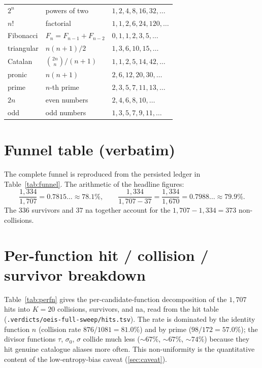\documentclass[11pt,a4paper]{article}
\newcommand{\sig}{\sigma}
\newcommand{\Ktwenty}{K\!=\!20}
\theoremstyle{definition}
\begin{document}
\begin{longtable}{@{}lll@{}}
$2^n$       & powers of two                             & $1,2,4,8,16,32,\dots$\\
$n!$        & factorial                                 & $1,1,2,6,24,120,\dots$\\
Fibonacci   & $F_n=F_{n-1}+F_{n-2}$                      & $0,1,1,2,3,5,\dots$\\
triangular  & $n(n{+}1)/2$                               & $1,3,6,10,15,\dots$\\
Catalan     & $\binom{2n}{n}/(n{+}1)$                    & $1,1,2,5,14,42,\dots$\\
pronic      & $n(n{+}1)$                                 & $2,6,12,20,30,\dots$\\
prime       & $n$-th prime                              & $2,3,5,7,11,13,\dots$\\
$2n$        & even numbers                              & $2,4,6,8,10,\dots$\\
odd         & odd numbers                               & $1,3,5,7,9,11,\dots$\\
\bottomrule
\end{longtable}

\section{Funnel table (verbatim)}
\label{app:funnel}

The complete funnel is reproduced from the persisted ledger in
Table~\ref{tab:funnel}. The arithmetic of the headline figures:
\[
  \frac{1{,}334}{1{,}707} = 0.7815\ldots \approx 78.1\%,
  \qquad
  \frac{1{,}334}{1{,}707 - 37} = \frac{1{,}334}{1{,}670} = 0.7988\ldots \approx 79.9\% .
\]
The $336$ survivors and $37$ na together account for the
$1{,}707 - 1{,}334 = 373$ non-collisions.

\section{Per-function hit / collision / survivor breakdown}
\label{app:perfn}

Table~\ref{tab:perfn} gives the per-candidate-function decomposition of the
$1{,}707$ hits into $\Ktwenty$ collisions, survivors, and na, read from the hit
table (\texttt{.verdicts/oeis-full-sweep/hits.tsv}). The rate is dominated by
the identity function $n$ (collision rate $876/1081 = 81.0\%$) and by prime
($98/172 = 57.0\%$); the divisor functions $\tau$, $\sig_0$, $\sig$ collide
much less ($\sim\!67\%$, $\sim\!67\%$, $\sim\!74\%$) because they hit
genuine catalogue aliases more often. This non-uniformity is the quantitative
content of the low-entropy-bias caveat (\textsection\ref{sec:caveat}).
\end{document}
